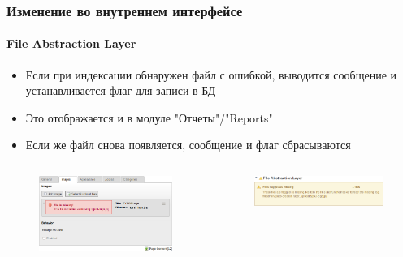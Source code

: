 \begin{frame}[fragile]
	\frametitle{Изменение во внутреннем интерфейсе}
	\framesubtitle{File Abstraction Layer}

	\begin{itemize}
		\item Если при индексации обнаружен файл с ошибкой, выводится сообщение и устанавливается флаг для записи в БД
		\item Это отображается и в модуле "Отчеты"/"Reports"
		\item Если же файл снова появляется, сообщение и флаг сбрасываются
	\end{itemize}

	\begin{columns}[T]

		\begin{column}{.5\textwidth}
			\begin{figure}
				\includegraphics[width=0.95\linewidth]{Images/BackendChanges/FalMissingFileContentElement.png}
			\end{figure}
		\end{column}

		\begin{column}{.5\textwidth}
			\begin{figure}
				\includegraphics[width=0.95\linewidth]{Images/BackendChanges/FalMissingFileReportsModule.png}
			\end{figure}
		\end{column}

	\end{columns}

\end{frame}

